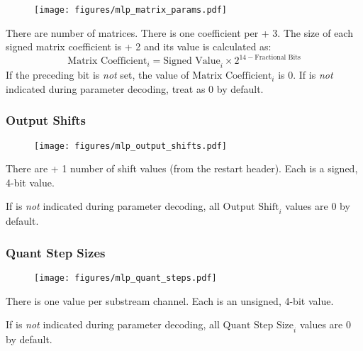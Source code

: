\begin{figure}[h]
\texttt{[image: figures/mlp\_matrix\_params.pdf]}
\end{figure}
\par
\noindent
There are  number of matrices.
There is one coefficient per  + 3.
The size of each signed matrix coefficient is  + 2
and its value is calculated as:
\begin{equation*}
\text{Matrix Coefficient}_i = \text{Signed Value}_i \times 2 ^ {14 - \text{Fractional Bits}}
\end{equation*}
If the preceding  bit is \textit{not} set,
the value of $\text{Matrix Coefficient}_i$ is 0.
If  is \textit{not} indicated during parameter decoding,
treat  as 0 by default.

\subsubsection{Output Shifts}


\begin{figure}[h]
\texttt{[image: figures/mlp\_output\_shifts.pdf]}
\end{figure}
\par
\noindent
There are  + 1 number of shift values
(from the restart header).
Each is a signed, 4-bit value.
\par
If  is \textit{not} indicated during parameter
decoding, all $\text{Output Shift}_i$ values are 0 by default.


\subsubsection{Quant Step Sizes}

\begin{figure}[h]
\texttt{[image: figures/mlp\_quant\_steps.pdf]}
\end{figure}
\par
\noindent
There is one  value per substream channel.
Each is an unsigned, 4-bit value.
\par
If  is \textit{not} indicated during parameter
decoding, all $\text{Quant Step Size}_i$ values are 0 by default.

